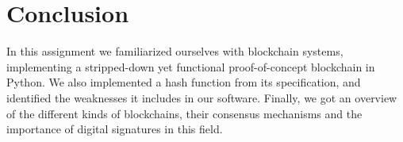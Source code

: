 \documentclass{article}
\begin{document}
\section{Conclusion}

In this assignment we familiarized ourselves with blockchain systems, implementing a stripped-down yet functional proof-of-concept blockchain in Python. We also implemented a hash function from its specification, and identified the weaknesses it includes in our software. Finally, we got an overview of the different kinds of blockchains, their consensus mechanisms and the importance of digital signatures in this field.


\bigskip




\end{document}
